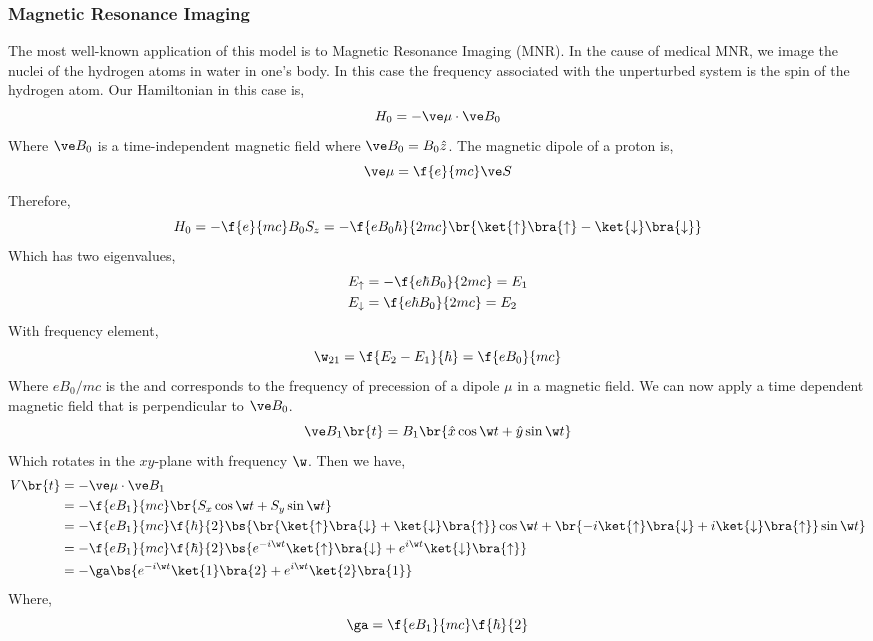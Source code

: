 \documentclass{article}
\begin{document}
\subsubsection{Magnetic Resonance Imaging}
The most well-known application of this model is to Magnetic Resonance Imaging (MNR). In the cause of medical MNR, we image the nuclei of the hydrogen atoms in water in one's body. In this case the frequency associated with the unperturbed system is the spin of the hydrogen atom. Our Hamiltonian in this case is,
\[ H_0 = - \ve \mu \cdot \ve B_0 \]
Where $\ve B_0$ is a time-independent magnetic field where $\ve B_0 = B_0 \hat z$. The magnetic dipole of a proton is,
\[ \ve \mu = \f{e}{mc} \ve S \]
Therefore,
\[ H_0 = -\f{e}{mc} B_0 S_z = -\f{e B_0 \hbar}{2mc} \br{\ket{\uparrow} \bra{\uparrow} - \ket{\downarrow} \bra{\downarrow}}\]
Which has two eigenvalues,
\begin{align*}
    E_{\uparrow}&= - \f{e \hbar B_0}{2mc} = E_1 \\
    E_{\downarrow}&= \f{e \hbar B_0}{2mc} = E_2
\end{align*}
With frequency element,
\[ \w_{21} = \f{E_2- E_1}{\hbar} = \f{eB_0}{mc} \]
Where $eB_0/mc$ is the  and corresponds to the frequency of precession of  a dipole $\mu$ in a magnetic field. We can now apply a time dependent magnetic field that is perpendicular to $\ve B_0$.
\[ \ve B_1\br{t} = B_1 \br{\hat x \cos \w t + \hat y \sin \w t} \]
Which rotates in the $xy$-plane with frequency $\w$. Then we have,
\begin{align*}
    V\br{t}
    &= - \ve \mu \cdot \ve B_1 \\
    &= - \f{eB_1}{mc}\br{S_x \cos \w t + S_y \sin \w t} \\
    &= - \f{eB_1}{mc} \f{\hbar}{2} \bs{\br{\ket{\uparrow}\bra{\downarrow} + \ket{\downarrow}\bra{\uparrow}} \cos \w t + \br{-i\ket{\uparrow}\bra{\downarrow} + i\ket{\downarrow}\bra{\uparrow}} \sin \w t} \\
    &= - \f{eB_1}{mc} \f{\hbar}{2} \bs{e^{-i \w t}\ket{\uparrow}\bra{\downarrow} + e^{i \w t}\ket{\downarrow}\bra{\uparrow}} \\
    &= - \ga \bs{e^{-i \w t}\ket{1}\bra{2} + e^{i \w t}\ket{2}\bra{1}} \\
\end{align*}
Where,
\[ \ga = \f{eB_1}{mc} \f{\hbar}{2} \]
\end{document}
